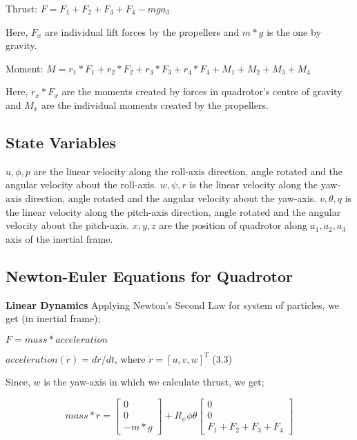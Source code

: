 Thrust: $F = F_1 + F_2 + F_3 + F_4 - mga_3$

Here, $F_x$ are individual lift forces by the propellers and $m*g$ is the one by gravity.
\vspace{10pt}

Moment: $M = r_1 * F_1 + r_2 * F_2 + r_3 * F_3 + r_4 * F_4 + M_1 + M_2 + M_3 + M_4$

Here, $r_x*F_x$ are the moments created by forces in quadrotor's centre of gravity and $M_x$ are the individual moments created by the propellers.
\\

\subsection{State Variables}

$u, \phi, p$ are the linear velocity along the roll-axis direction, angle rotated and the angular velocity about the roll-axis.
$w, \psi, r$ is the linear velocity along the yaw-axis direction, angle rotated and the angular velocity about the yaw-axis.
$v, \theta, q$ is the linear velocity along the pitch-axis direction, angle rotated and the angular velocity about the pitch-axis.
$x, y, z$ are the position of quadrotor along $a_1, a_2, a_3$ axis of the inertial frame.
\\


\subsection{Newton-Euler Equations for Quadrotor}

\textbf{Linear Dynamics} Applying Newton's Second Law for system of particles, we get (in inertial frame);

$F = mass * acceleration$ 

$acceleration (\ddot{r}) = d\dot{r}/dt$, where $\dot{r} = [u,v,w]^T$ (3.3)
\vspace{10pt}

Since, $w$ is the yaw-axis in which we calculate thrust, we get;

\[
mass*\ddot{r} = \begin{bmatrix}
    0 \\
    0 \\
    -m*g
\end{bmatrix} + 
R_\psi\phi\theta \begin{bmatrix}
    0 \\
    0 \\
    F_1 + F_2 + F_3 + F_4
\end{bmatrix}
\]
\vspace{15pt}
\\

